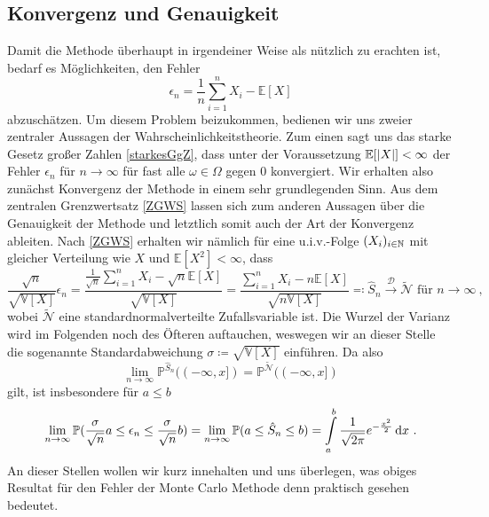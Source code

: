 	\subsection{Konvergenz und Genauigkeit}
	Damit die Methode überhaupt in irgendeiner Weise als nützlich zu erachten ist, bedarf es Möglichkeiten, den Fehler \[
	 \epsilon_n = \frac{1}{n}\sum_{i=1}^{n}X_i -  \mathbb{E}[X]
	\]
	abzuschätzen. Um diesem Problem beizukommen, bedienen wir uns zweier zentraler Aussagen der Wahrscheinlichkeitstheorie. Zum einen sagt uns das starke Gesetz großer Zahlen \ref{starkesGgZ}, dass unter der Voraussetzung $ \mathbb{E}[| X |]<\infty $ der Fehler $ \epsilon_n $ für $ n \to \infty $ für fast alle $ \omega \in \Omega $ gegen $ 0 $ konvergiert. Wir erhalten also zunächst Konvergenz der Methode in einem sehr grundlegenden Sinn. Aus dem zentralen Grenzwertsatz \ref{ZGWS} lassen sich zum anderen Aussagen über die Genauigkeit der Methode und letztlich somit auch der Art der Konvergenz ableiten. Nach \ref{ZGWS} erhalten wir nämlich für eine u.i.v.-Folge $ (X_i)_{i \in \mathbb{N}} $ mit gleicher Verteilung wie $ X $ und $ \mathbb{E}[X^2] < \infty $, dass
	 \[ 
	 \frac{\sqrt{n}}{\sqrt{\mathbb{V}[X]}} \epsilon_n =  \frac{\frac{1}{\sqrt{n}}\sum_{i=1}^{n}X_i-\sqrt{n}\mathbb{E}[X]}{\sqrt{\mathbb{V}[X]}} = \frac{\sum_{i=1}^{n}X_i-n\mathbb{E}[X]}{\sqrt{n\mathbb{V}[X]}} \eqqcolon \hat{S}_n \stackrel{\mathcal{D}}{\to}  \widetilde{\mathcal{N}} \text{ für } n \to \infty \ ,
	 \]
	 wobei  $\widetilde{\mathcal{N}}$ eine standardnormalverteilte Zufallsvariable ist. Die Wurzel der Varianz wird im Folgenden noch des Öfteren auftauchen, weswegen wir an dieser Stelle die sogenannte Standardabweichung $ \sigma \coloneqq \sqrt{\mathbb{V}[X]} $ einführen.
	 Da also 
	 \[ \lim\limits_{n \to \infty} \mathbb{P}^{\hat{S}_n}((-\infty,x]) = \mathbb{P}^{ \widetilde{\mathcal{N}}}((-\infty,x])
	 \]
	 gilt, ist insbesondere für $ a \leq b $
	 \[
	 	\lim\limits_{n \to \infty} \mathbb{P}(\frac{\sigma}{\sqrt{n}}a \leq \epsilon_n \leq \frac{\sigma}{\sqrt{n}}b) = \lim\limits_{n \to \infty} \mathbb{P}(a \leq \hat{S}_n \leq b) = \int\limits_a^b \frac{1}{\sqrt{2\pi}}e^{-\frac{x^2}{2}} \, \mathrm{d} x \ .
	 \]
	 An dieser Stellen wollen wir kurz innehalten und uns überlegen, was obiges Resultat für den Fehler der Monte Carlo Methode denn praktisch gesehen bedeutet. 
